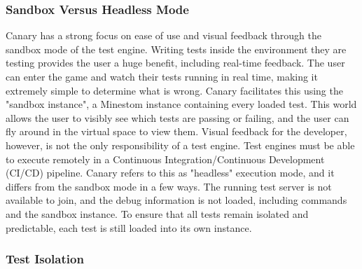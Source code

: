 \documentclass{article}
\begin{document}
\begin{onehalfspacing}
\subsubsection{Sandbox Versus Headless Mode}

Canary has a strong focus on ease of use and visual feedback through the
sandbox mode of the test engine. Writing tests inside the environment
they are testing provides the user a huge benefit, including real-time
feedback. The user can enter the game and watch their tests running in
real time, making it extremely simple to determine what is wrong. Canary
facilitates this using the "sandbox instance", a Minestom instance
containing every loaded test. This world allows the user to visibly see
which tests are passing or failing, and the user can fly around in the
virtual space to view them. Visual feedback for the developer, however,
is not the only responsibility of a test engine. Test engines must be
able to execute remotely in a Continuous Integration/Continuous
Development (CI/CD) pipeline. Canary refers to this as "headless"
execution mode, and it differs from the sandbox mode in a few ways. The
running test server is not available to join, and the debug information
is not loaded, including commands and the sandbox instance. To ensure
that all tests remain isolated and predictable, each test is still
loaded into its own instance.

\subsubsection{Test Isolation}


\end{onehalfspacing}
\end{document}

